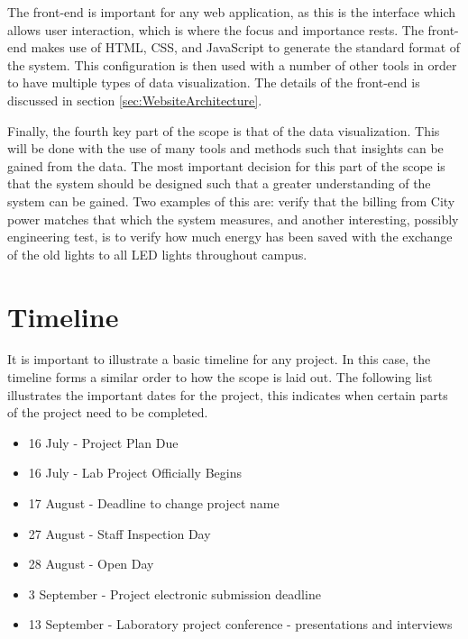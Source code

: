 \documentclass[12pt,onecolumn]{IEEEtran}
\begin{document}
The front-end is important for any web application, as this is the interface which allows user interaction, which is where the focus and importance rests. The front-end makes use of HTML, CSS, and JavaScript to generate the standard format of the system. This configuration is then used with a number of other tools in order to have multiple types of data visualization.
The details of the front-end is discussed in section \ref{sec:WebsiteArchitecture}.

Finally, the fourth key part of the scope is that of the data visualization. This will be done with the use of many tools and methods such that insights can be gained from the data. The most important decision for this part of the scope is that the system should be designed such that a greater understanding of the system can be gained. Two examples of this are: verify that the billing from City power matches that which the system measures, and another interesting, possibly engineering test, is to verify how much energy has been saved with the exchange of the old lights to all LED lights throughout campus. 




\section{Timeline} \label{sec:Timeline}
It is important to illustrate a basic timeline for any project. In this case, the timeline forms a similar order to how the scope is laid out. 
The following list illustrates the important dates for the project, this indicates when certain parts of the project need to be completed. 

\begin{itemize}
    \item 16 July - Project Plan Due
    \item 16 July - Lab Project Officially Begins
    \item 17 August - Deadline to change project name
    \item 27 August - Staff Inspection Day
    \item 28 August - Open Day
    \item 3 September - Project electronic submission deadline
    \item 13 September - Laboratory project conference - presentations and interviews
\end{itemize}
\end{document}
